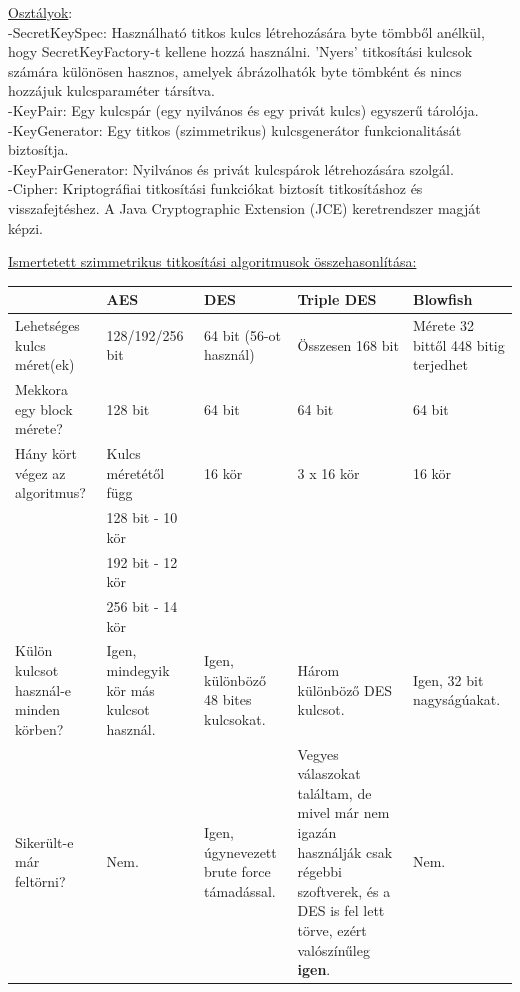 \noindent \underline{Osztályok}:
\vspace{5pt}\\-SecretKeySpec: Használható titkos kulcs létrehozására byte tömbből anélkül, hogy SecretKeyFactory-t kellene hozzá használni. ’Nyers’ titkosítási kulcsok számára különösen hasznos, amelyek ábrázolhatók byte tömbként és nincs hozzájuk kulcsparaméter társítva.
\vspace{5pt}\\-KeyPair: Egy kulcspár (egy nyilvános és egy privát kulcs) egyszerű tárolója.
\vspace{5pt}\\-KeyGenerator: Egy titkos (szimmetrikus) kulcsgenerátor funkcionalitását biztosítja.
\vspace{5pt}\\-KeyPairGenerator: Nyilvános és privát kulcspárok létrehozására szolgál.
\vspace{5pt}\\-Cipher: Kriptográfiai titkosítási funkciókat biztosít titkosításhoz és visszafejtéshez. A Java Cryptographic Extension (JCE) keretrendszer magját képzi. \newline

\noindent \underline{Ismertetett szimmetrikus titkosítási algoritmusok összehasonlítása:}

\begin{center}
	
	
	\begin{tabular}{|p{2.4cm}|p{2.7cm}|p{2.7cm}|p{2.7cm}|p{2.7cm}|}
		\hline
		 & \textbf{AES} & \textbf{DES} & \textbf{Triple DES}  & \textbf{Blowfish} \\
		\hline
		Lehetséges kulcs méret(ek) & 128/192/256 bit & 64 bit (56-ot használ) & Összesen 168 bit & Mérete 32 bittől 448 bitig terjedhet \\
		\hline
		Mekkora egy block mérete? & 128 bit & 64 bit & 64 bit & 64 bit \\
		\hline
		Hány kört végez az algoritmus? & Kulcs méretétől függ  & 16 kör & 3 x 16 kör & 16 kör \\
		 & 128 bit - 10 kör & & & \\
		 & 192 bit - 12 kör & & & \\
		 & 256 bit - 14 kör & & & \\
		\hline
		Külön kulcsot használ-e minden körben? & Igen, mindegyik kör más kulcsot használ. & Igen, különböző 48 bites kulcsokat. & Három különböző DES kulcsot. & Igen, 32 bit nagyságúakat. \\
		\hline
		Sikerült-e már feltörni? & Nem. & Igen, úgynevezett brute force támadással. & Vegyes válaszokat találtam, de mivel már nem igazán használják csak régebbi szoftverek, és a DES is fel lett törve, ezért valószínűleg \textbf{igen}. & Nem. \\
		\hline
	\end{tabular}
\end{center}

